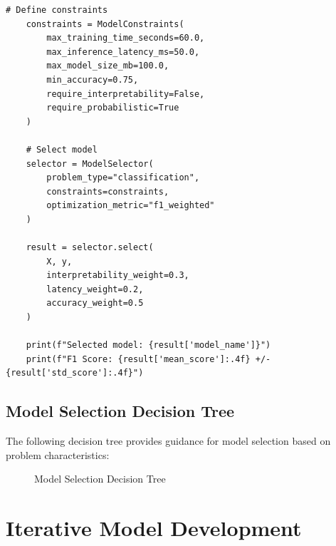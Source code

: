 \begin{lstlisting}[style=python, caption={Automated Model Selection Framework}]
    # Define constraints
    constraints = ModelConstraints(
        max_training_time_seconds=60.0,
        max_inference_latency_ms=50.0,
        max_model_size_mb=100.0,
        min_accuracy=0.75,
        require_interpretability=False,
        require_probabilistic=True
    )

    # Select model
    selector = ModelSelector(
        problem_type="classification",
        constraints=constraints,
        optimization_metric="f1_weighted"
    )

    result = selector.select(
        X, y,
        interpretability_weight=0.3,
        latency_weight=0.2,
        accuracy_weight=0.5
    )

    print(f"Selected model: {result['model_name']}")
    print(f"F1 Score: {result['mean_score']:.4f} +/- {result['std_score']:.4f}")
\end{lstlisting}

\subsection{Model Selection Decision Tree}

The following decision tree provides guidance for model selection based on problem characteristics:

\begin{figure}[h]
\centering
{}
\caption{Model Selection Decision Tree}
\label{fig:model_selection_tree}
\end{figure}

\section{Iterative Model Development}

